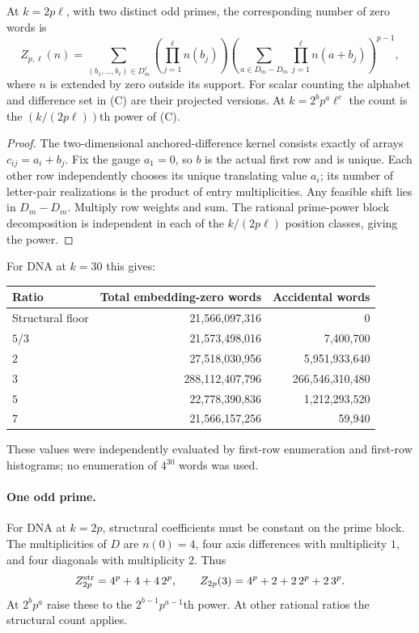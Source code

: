 \begin{theorem}\label{ext:thm:count}
At $k=2p\ell$, with two distinct odd primes, the corresponding number of zero words is
\[
Z_{p,\ell}(n)=
\sum_{(b_1,\ldots,b_\ell)\in D_m^\ell}
\left(\prod_{j=1}^{\ell}n(b_j)\right)
\left(\sum_{a\in D_m-D_m}\prod_{j=1}^{\ell}n(a+b_j)\right)^{p-1},                 \tag{C}
\]
where $n$ is extended by zero outside its support. For scalar counting the alphabet and difference set in (C) are their projected versions. At $k=2^bp^a\ell^c$ the count is the $(k/(2p\ell))$th power of (C).
\end{theorem}
\begin{proof}
The two-dimensional anchored-difference kernel consists exactly of arrays $c_{ij}=a_i+b_j$. Fix the gauge $a_1=0$, so $b$ is the actual first row and is unique. Each other row independently chooses its unique translating value $a_i$; its number of letter-pair realizations is the product of entry multiplicities. Any feasible shift lies in $D_m-D_m$. Multiply row weights and sum. The rational prime-power block decomposition is independent in each of the $k/(2p\ell)$ position classes, giving the power.
\end{proof}
For DNA at $k=30$ this gives:
\begin{center}\begin{tabular}{lrr}\toprule
Ratio & Total embedding-zero words & Accidental words\\\midrule
Structural floor & 21,566,097,316 & 0\\
$5/3$ & 21,573,498,016 & 7,400,700\\
$2$ & 27,518,030,956 & 5,951,933,640\\
$3$ & 288,112,407,796 & 266,546,310,480\\
$5$ & 22,778,390,836 & 1,212,293,520\\
$7$ & 21,566,157,256 & 59,940\\\bottomrule
\end{tabular}\end{center}
These values were independently evaluated by first-row enumeration and first-row histograms; no enumeration of $4^{30}$ words was used.

\paragraph{One odd prime.}
For DNA at $k=2p$, structural coefficients must be constant on the prime block. The multiplicities of $D$ are $n(0)=4$, four axis differences with multiplicity $1$, and four diagonals with multiplicity $2$. Thus
\[
Z^{\rm str}_{2p}=4^p+4+4\,2^p,\qquad
Z_{2p}(3)=4^p+2+2\,2^p+2\,3^p.
\]
At $2^bp^a$ raise these to the $2^{b-1}p^{a-1}$th power. At other rational ratios the structural count applies.

